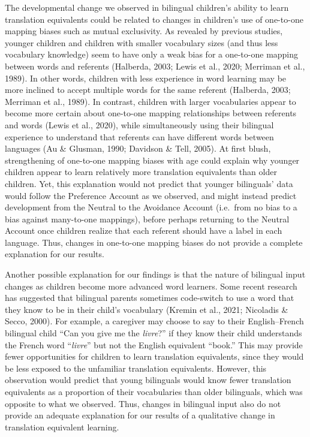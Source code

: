 \documentclass[
  english,
  ,man,floatsintext]{apa6}
\begin{document}
The developmental change we observed in bilingual children's ability to learn translation equivalents could be related to changes in children's use of one-to-one mapping biases such as mutual exclusivity. As revealed by previous studies, younger children and children with smaller vocabulary sizes (and thus less vocabulary knowledge) seem to have only a weak bias for a one-to-one mapping between words and referents (Halberda, 2003; Lewis et al., 2020; Merriman et al., 1989). In other words, children with less experience in word learning may be more inclined to accept multiple words for the same referent (Halberda, 2003; Merriman et al., 1989). In contrast, children with larger vocabularies appear to become more certain about one-to-one mapping relationships between referents and words (Lewis et al., 2020), while simultaneously using their bilingual experience to understand that referents can have different words between languages (Au \& Glusman, 1990; Davidson \& Tell, 2005). At first blush, strengthening of one-to-one mapping biases with age could explain why younger children appear to learn relatively more translation equivalents than older children. Yet, this explanation would not predict that younger bilinguals' data would follow the Preference Account as we observed, and might instead predict development from the Neutral to the Avoidance Account (i.e.~from no bias to a bias against many-to-one mappings), before perhaps returning to the Neutral Account once children realize that each referent should have a label in each language. Thus, changes in one-to-one mapping biases do not provide a complete explanation for our results.

Another possible explanation for our findings is that the nature of bilingual input changes as children become more advanced word learners. Some recent research has suggested that bilingual parents sometimes code-switch to use a word that they know to be in their child's vocabulary (Kremin et al., 2021; Nicoladis \& Secco, 2000). For example, a caregiver may choose to say to their English--French bilingual child ``Can you give me the \emph{livre}?'' if they know their child understands the French word ``\emph{livre}'' but not the English equivalent ``book.'' This may provide fewer opportunities for children to learn translation equivalents, since they would be less exposed to the unfamiliar translation equivalents. However, this observation would predict that young bilinguals would know fewer translation equivalents as a proportion of their vocabularies than older bilinguals, which was opposite to what we observed. Thus, changes in bilingual input also do not provide an adequate explanation for our results of a qualitative change in translation equivalent learning.
\end{document}
